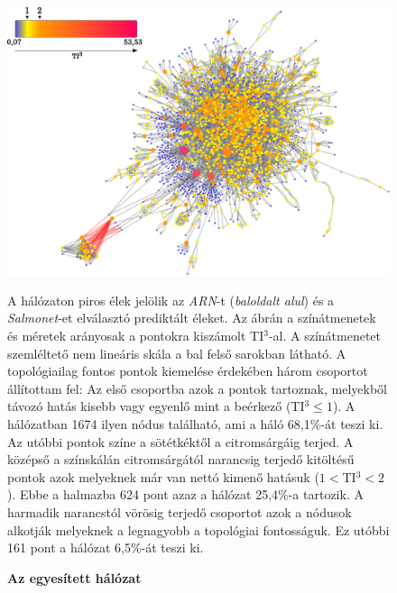 \documentclass[a4paper,12pt]{article}
\newenvironment{imgdesc}{
		\small
		\singlespacing
		\begin{center}
		
	}{
		\end{center}	
	}
\begin{document}
					\begin{figure}[H]
						\includegraphics[scale=0.6]{img/merged.pdf}
						\centering
						\caption{\textbf{ Az egyesített hálózat}}
						\begin{imgdesc}
							A hálózaton piros élek jelölik az \textit{ARN}-t (\textit{baloldalt alul}) és a \textit{Salmonet}-et elválasztó prediktált éleket. Az ábrán a színátmenetek és méretek arányosak a pontokra kiszámolt TI$^3$-al. A színátmenetet szemléltető nem lineáris skála a bal felső sarokban látható. A topológiailag fontos pontok kiemelése érdekében három csoportot állítottam fel: Az első csoportba azok a pontok tartoznak, melyekből távozó hatás kisebb vagy egyenlő mint a beérkező (TI$^3\leq1$). A hálózatban 1674 ilyen nódus található, ami a háló 68,1\%-át teszi ki. Az utóbbi pontok színe a sötétkéktől a citromsárgáig terjed. A középső a színskálán citromsárgától narancsig terjedő kitöltésű pontok azok melyeknek már van nettó kimenő hatásuk ($1<$TI$^3<2$). Ebbe a halmazba 624 pont azaz a hálózat 25,4\%-a tartozik. A harmadik narancstól vörösig terjedő csoportot azok a nódusok alkotják melyeknek a legnagyobb a topológiai fontosságuk. Ez utóbbi 161 pont a hálózat 6,5\%-át teszi ki.
						\end{imgdesc}
			
						\label{fig:merged}			 		 
					\end{figure}		
					
\end{document}

